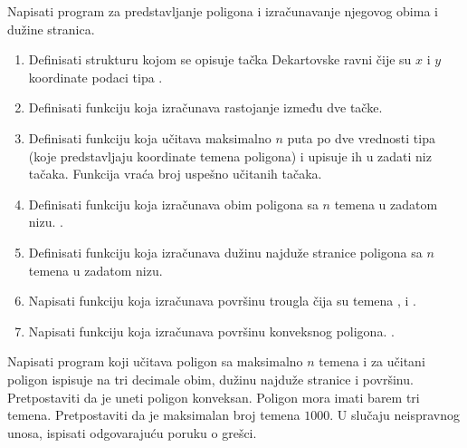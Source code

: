 \begin{Exercise}[label=struc.10] 
Napisati program za predstavljanje poligona i izračunavanje njegovog
obima i dužine stranica.
\begin{enumerate}
\item Definisati strukturu  kojom se opisuje
  tačka Dekartovske ravni čije su $x$ i $y$ koordinate podaci tipa
  .

\item Definisati funkciju 
  koja izračunava rastojanje između dve tačke.

\item Definisati funkciju  koja učitava maksimalno $n$ puta po dve
  vrednosti tipa  (koje predstavljaju koordinate temena
  poligona) i upisuje ih u zadati niz tačaka. Funkcija vraća broj
  uspešno učitanih tačaka.

\item Definisati funkciju  koja izračunava obim poligona sa $n$ temena u zadatom nizu.
  .

\item Definisati funkciju  koja izračunava dužinu najduže stranice
  poligona sa $n$ temena u zadatom nizu.

\item Napisati funkciju  
koja izračunava površinu trougla čija su temena ,  i .

\item Napisati funkciju  
koja izračunava površinu konveksnog poligona. .
\end{enumerate}
Napisati program koji učitava poligon sa maksimalno $n$ temena
  i za učitani poligon ispisuje na tri decimale
  obim, dužinu najduže stranice i površinu. Pretpostaviti da je
  uneti poligon konveksan. Poligon mora imati barem tri temena.
  Pretpostaviti da je maksimalan broj temena $1000$.
  U slučaju neispravnog unosa, ispisati odgovarajuću poruku o grešci.


\end{Exercise}
